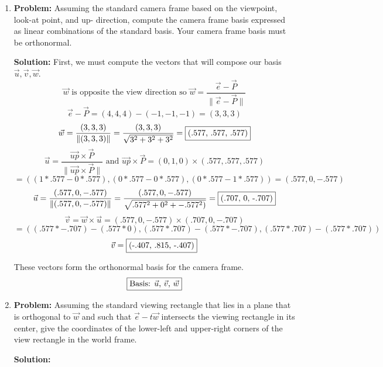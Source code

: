 \documentclass[a4paper, 12pt]{article}
\newcommand{\norm}[1]{\lVert#1\rVert}
\begin{document}

\begin{enumerate}
    \item \textbf{Problem:} Assuming the standard camera frame based on the viewpoint, look-at point, and up- direction, compute the camera frame basis expressed as linear combinations of the standard basis.  Your camera frame basis must be orthonormal.

        \textbf{Solution:} First, we must compute the vectors that will compose our basis \(\vec{u}, \vec{v}, \vec{w}\).
        \[\vec{w} \text{ is opposite the view direction so } \vec{w} = \frac{\vec{e} - \vec{P}}{\norm{\vec{e} - \vec{P}}}\]
        \[ \vec{e} - \vec{P} = (4,4,4) - (-1,-1,-1) = (3,3,3) \]
        \[ \vec{w} = \frac{(3,3,3)}{\norm{(3,3,3)}} = \frac{(3,3,3)}{\sqrt{3^2 + 3^2 + 3^2}} = \fbox{(.577, .577, .577)} \]
        \[ \vec{u} = \frac{\vec{up} \times \vec{P}}{\norm{\vec{up} \times \vec{P}}} \text{ and } \vec{up} \times \vec{P} = (0,1,0) \times (.577, .577, .577) \]
        \[= ( (1*.577 - 0*.577), (0*.577 - 0*.577), (0*.577 - 1*.577))  = (.577, 0, -.577)\]
        \[\vec{u} = \frac{(.577, 0, -.577)}{\norm{(.577, 0, -.577)}} = \frac{(.577, 0, -.577)}{\sqrt{.577^2 + 0^2 + -.577^2)}} = \fbox{(.707, 0, -.707)}\]
        \[\vec{v} = \vec{w} \times \vec{u} = (.577, 0, -.577) \times (.707, 0, -.707)\]
        \[= \left( \left( .577*-.707 \right) - \left( .577*0 \right), \left( .577*.707 \right) - \left( .577*-.707 \right), \left( .577*.707 \right) - \left( .577*.707 \right) \right)\]
        \[ \vec{v} = \fbox{(-.407, .815, -.407)}\]

        These vectors form the orthonormal basis for the camera frame.
        \[\fbox{Basis: $\vec{u}$, $\vec{v}$, $\vec{w}$}\]

    \item \textbf{Problem:} Assuming the standard viewing rectangle that lies in a plane that is orthogonal to \(\vec{w}\) and such that \(\vec{e} - t\vec{w}\) intersects the viewing rectangle in its center, give the coordinates of the lower-left and upper-right corners of the view rectangle in the world frame.

    \textbf{Solution:} 


\end{enumerate}
\end{document}
